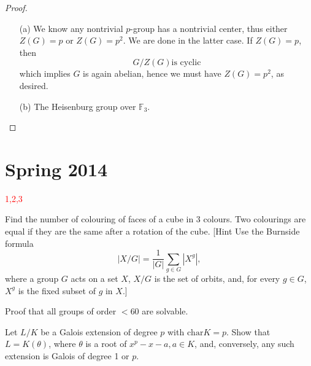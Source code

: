 \documentclass[openany]{book}
\newcommand{\F}{\mathbb{F}}
\begin{document}
\begin{proof}
    \begin{itemize}
        \item[(a)] We know any nontrivial $p$-group has a nontrivial center, thus either $Z(G)=p$ or $Z(G)=p^2$. We are done in the latter case. If $Z(G)=p$, then 
        \begin{equation*}
            G/Z(G) \text{is cyclic}
        \end{equation*}
        which implies $G$ is again abelian, hence we must have $Z(G)=p^2$, as desired.
        \item[(b)] The Heisenburg group over $\F_3$.
    \end{itemize}
\end{proof}




\chapter{Spring 2014}


\textcolor{red}{1,2,3}

\begin{prob}
    Find the number of colouring of faces of a cube in 3 colours. Two colourings are equal if they are the same after a rotation of the cube. [Hint Use the Burnside formula \[|X/G|=\frac{1}{|G|}\sum_{g\in G}|X^{g}|,\] where a group \(G\) acts on a set \(X\), \(X/G\) is the set of orbits, and, for every \(g\in G\), \(X^{g}\) is the fixed subset of \(g\) in \(X\).]
\end{prob}


\begin{prob}
    Proof that all groups of order \(<60\) are solvable.
\end{prob}



\begin{prob}
    Let \(L/K\) be a Galois extension of degree \(p\) with \(\text{char}K=p\). Show that \(L=K(\theta)\), where \(\theta\) is a root of \(x^{p}-x-a,a\in K\), and, conversely, any such extension is Galois of degree 1 or \(p\).
\end{prob}
\end{document}
